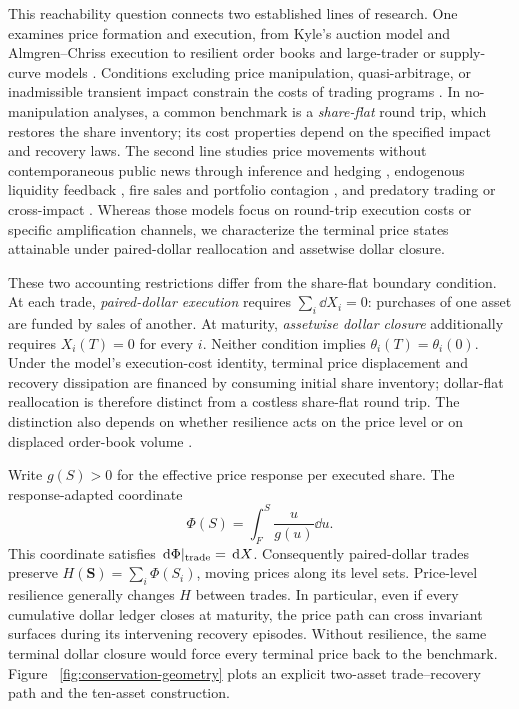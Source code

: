 \documentclass[review,hidelinks,onefignum,onetabnum]{siamonline250211}
\begin{document}
This reachability question connects two established lines of research.
One examines price formation and execution, from Kyle's auction model
\citep{Kyle1985} and Almgren--Chriss execution \citep{AlmgrenChriss2001}
to resilient order books \citep{ObizhaevaWang2013,AlfonsiSchied2010,AlfonsiFruthSchied2010}
and large-trader or supply-curve models
\citep{BankBaum2004,CetinJarrowProtter2004}.
Conditions excluding price manipulation, quasi-arbitrage, or
inadmissible transient impact constrain the costs of trading programs
\citep{HubermanStanzl2004,Gatheral2010,AlfonsiSchiedSlynko2012,CuratoGatheralLillo2017}.
In no-manipulation analyses, a common benchmark is a
\emph{share-flat} round trip, which restores the share inventory;
its cost properties depend on the specified impact and recovery laws.
The second line studies price movements without contemporaneous
public news through inference and hedging \citep{GennotteLeland1990,Romer1993},
endogenous liquidity feedback \citep{HuangWang2009},
fire sales and portfolio contagion
\citep{CespaFoucault2014,ContWagalath2013,ContSchaanning2017,KirilenkoEtAl2017},
and predatory trading or cross-impact
\citep{BrunnermeierPedersen2005,AlfonsiKlockSchied2016,SchneiderLillo2019,BenzaquenEtAl2017,CordoniLillo2024}.
Whereas those models focus on round-trip execution costs or specific
amplification channels, we characterize the terminal price states
attainable under paired-dollar reallocation and assetwise dollar closure.

These two accounting restrictions differ from the share-flat boundary
condition. At each trade, \emph{paired-dollar execution} requires
$\sum_i\dd X_i=0$: purchases of one asset are funded by sales of
another. At maturity, \emph{assetwise dollar closure} additionally
requires $X_i(T)=0$ for every $i$. Neither condition implies
$\theta_i(T)=\theta_i(0)$. Under the model's execution-cost identity,
terminal price displacement and recovery dissipation are financed
by consuming initial share inventory; dollar-flat reallocation is
therefore distinct from a costless share-flat round trip.
The distinction also depends on whether resilience acts on the
price level or on displaced order-book volume
\citep{AlfonsiFruthSchied2010,RochSoner2013}.

Write $g(S)>0$ for the effective
price response per executed share. The response-adapted coordinate
\begin{equation}\label{eq:phi-intro}
\Phi(S)=\int_F^S\frac{u}{g(u)}\dd u.
\end{equation}
This coordinate satisfies $\,\mathrm{d}\Phi|_{\rm trade}=\,\mathrm{d} X$. Consequently paired-dollar
trades preserve
$H(\bm S)=\sum_i\Phi(S_i)$, moving prices along its level sets.
Price-level resilience generally changes $H$ between trades. In
particular, even if every cumulative dollar ledger closes at maturity,
the price path can cross invariant surfaces during its intervening
recovery episodes. Without resilience, the same terminal dollar closure
would force every terminal price back to the benchmark. Figure~
\ref{fig:conservation-geometry} plots an explicit two-asset
trade--recovery path and the ten-asset construction.
\end{document}
